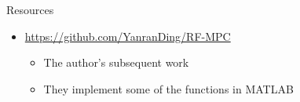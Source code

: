 \documentclass{beamer}
\begin{document}
\begin{frame}{Resources}

\begin{itemize}
    \item \url{https://github.com/YanranDing/RF-MPC}
        \begin{itemize}
            \item The author's subsequent work
            \item They implement some of the functions in MATLAB
        \end{itemize}    
\end{itemize}

\end{frame}
\end{document}

